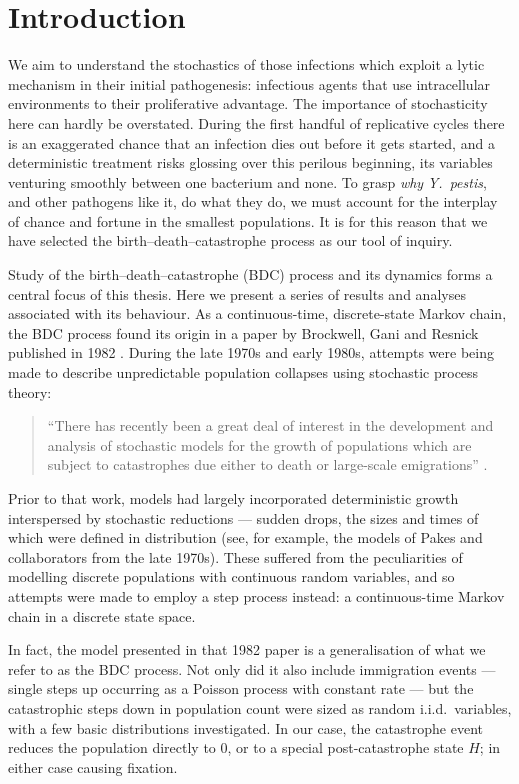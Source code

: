\section{Introduction}

We aim to understand the stochastics of those infections which exploit a lytic
mechanism in their initial pathogenesis: infectious agents that use intracellular
environments to their proliferative advantage. The importance of stochasticity
here can hardly be overstated. During the first handful of replicative cycles
there is an exaggerated chance that an infection dies out before it gets started,
and a deterministic treatment risks glossing over this perilous beginning, its
variables venturing smoothly between one bacterium and none. To grasp
\textit{why} \textit{Y.~pestis}, and other pathogens like it, do what they do,
we must account for the interplay of chance and fortune in the smallest
populations. It is for this reason that we have selected the
birth--death--catastrophe process as our tool of inquiry.

Study of the birth--death--catastrophe (BDC) process and its dynamics forms a
central focus of this thesis. Here we present a series of results and analyses
associated with its behaviour. As a continuous-time, discrete-state Markov
chain, the BDC process found its origin in a paper by Brockwell, Gani and
Resnick published in 1982 \cite{brockwell1982birth}. During the late 1970s and
early 1980s, attempts were being made to describe unpredictable population
collapses using stochastic process theory:
\begin{quotation}
``There has recently been a great deal of interest in the development and
analysis of stochastic models for the growth of populations which are subject to
catastrophes due either to death or large-scale emigrations''
\cite{brockwell1982birth}.
\end{quotation}
Prior to that work, models had largely incorporated deterministic growth
interspersed by stochastic reductions --- sudden drops, the sizes and times of
which were defined in distribution (see, for example, the models of Pakes and
collaborators from the late 1970s). These suffered from the peculiarities of
modelling discrete populations with continuous random variables, and so attempts
were made to employ a step process instead: a continuous-time Markov chain in a
discrete state space.

In fact, the model presented in that 1982 paper is a generalisation of what we
refer to as the BDC process. Not only did it also include immigration events ---
single steps up occurring as a Poisson process with constant rate --- but the
catastrophic steps down in population count were sized as random i.i.d.\
variables, with a few basic distributions investigated. In our case, the
catastrophe event reduces the population directly to $0$, or to a special
post-catastrophe state $H$; in either case causing fixation.


